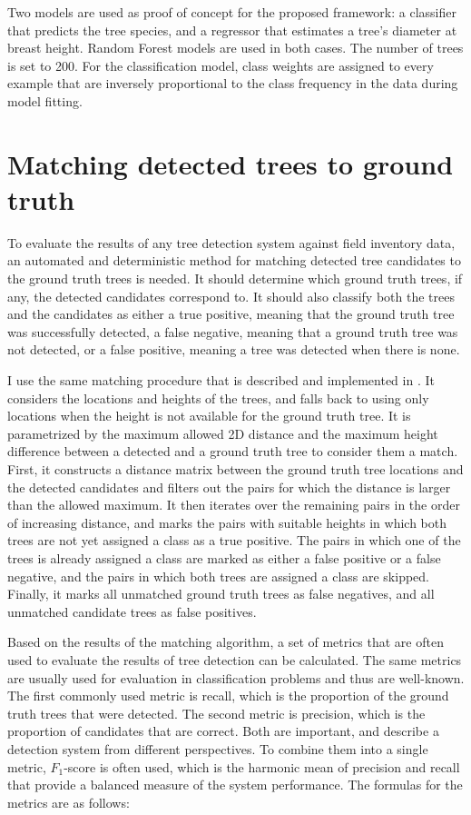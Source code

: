 Two models are used as proof of concept for the proposed framework: a classifier that predicts the tree species, and a regressor that estimates a tree's diameter at breast height.
Random Forest models are used in both cases.
The number of trees is set to 200.
For the classification model, class weights are assigned to every example that are inversely proportional to the class frequency in the data during model fitting.

\section{Matching detected trees to ground truth}\label{sec-matching-algorithm}

To evaluate the results of any tree detection system against field inventory data, an automated and deterministic method for matching detected tree candidates to the ground truth trees is needed.
It should determine which ground truth trees, if any, the detected candidates correspond to.
It should also classify both the trees and the candidates as either a true positive, meaning that the ground truth tree was successfully detected, a false negative, meaning that a ground truth tree was not detected, or a false positive, meaning a tree was detected when there is none.

I use the same matching procedure that is described and implemented in \citet{dubrovinOpenDatasetIndividual2024}.
It considers the locations and heights of the trees, and falls back to using only locations when the height is not available for the ground truth tree.
It is parametrized by the maximum allowed 2D distance and the maximum height difference between a detected and a ground truth tree to consider them a match.
First, it constructs a distance matrix between the ground truth tree locations and the detected candidates and filters out the pairs for which the distance is larger than the allowed maximum.
It then iterates over the remaining pairs in the order of increasing distance, and marks the pairs with suitable heights in which both trees are not yet assigned a class as a true positive.
The pairs in which one of the trees is already assigned a class are marked as either a false positive or a false negative, and the pairs in which both trees are assigned a class are skipped.
Finally, it marks all unmatched ground truth trees as false negatives, and all unmatched candidate trees as false positives.

Based on the results of the matching algorithm, a set of metrics that are often used to evaluate the results of tree detection can be calculated.
The same metrics are usually used for evaluation in classification problems and thus are well-known.
The first commonly used metric is recall, which is the proportion of the ground truth trees that were detected.
The second metric is precision, which is the proportion of candidates that are correct.
Both are important, and describe a detection system from different perspectives.
To combine them into a single metric, $F_1$-score is often used, which is the harmonic mean of precision and recall that provide a balanced measure of the system performance.
The formulas for the metrics are as follows:

